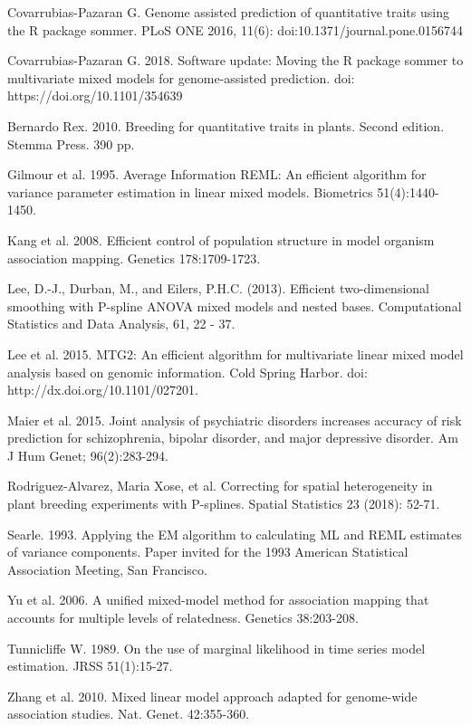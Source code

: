 \documentclass[a4paper]{book}
\begin{document}
\begin{References}\relax

Covarrubias-Pazaran G. Genome assisted prediction of quantitative traits using the R package sommer. PLoS ONE 2016, 11(6): doi:10.1371/journal.pone.0156744   

Covarrubias-Pazaran G. 2018. Software update: Moving the R package sommer to multivariate mixed models for genome-assisted prediction. doi: https://doi.org/10.1101/354639

Bernardo Rex. 2010. Breeding for quantitative traits in plants. Second edition. Stemma Press. 390 pp.

Gilmour et al. 1995. Average Information REML: An efficient algorithm for variance parameter estimation in linear mixed models. Biometrics 51(4):1440-1450.

Kang et al. 2008. Efficient control of population structure in model organism association mapping. Genetics 178:1709-1723.

Lee, D.-J., Durban, M., and Eilers, P.H.C. (2013). Efficient two-dimensional smoothing with P-spline ANOVA mixed models and nested bases. Computational Statistics and Data Analysis, 61, 22 - 37.

Lee et al. 2015. MTG2: An efficient algorithm for multivariate linear mixed model analysis based on genomic information. Cold Spring Harbor. doi: http://dx.doi.org/10.1101/027201.

Maier et al. 2015. Joint analysis of psychiatric disorders increases accuracy of risk prediction for schizophrenia, bipolar disorder, and major depressive disorder. Am J Hum Genet; 96(2):283-294.

Rodriguez-Alvarez, Maria Xose, et al. Correcting for spatial heterogeneity in plant breeding experiments with P-splines. Spatial Statistics 23 (2018): 52-71.

Searle. 1993. Applying the EM algorithm to calculating ML and REML estimates of variance components. Paper invited for the 1993 American Statistical Association Meeting, San Francisco.

Yu et al. 2006. A unified mixed-model method for association mapping that accounts for multiple levels of relatedness. Genetics 38:203-208.

Tunnicliffe W. 1989. On the use of marginal likelihood in time series model estimation. JRSS 51(1):15-27.

Zhang et al. 2010. Mixed linear model approach adapted for genome-wide association studies. Nat. Genet. 42:355-360.

\end{References}
\end{document}
